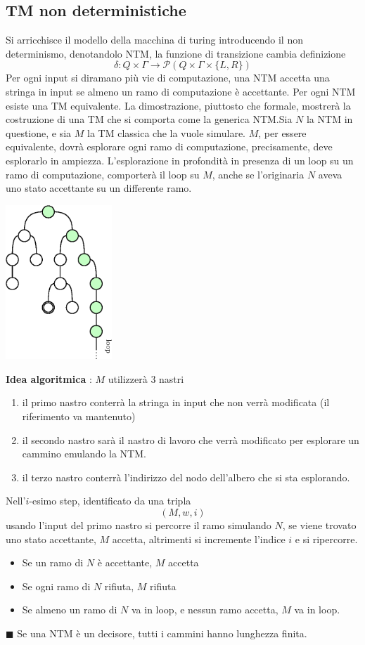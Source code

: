 \documentclass[10pt, letterpaper]{report}
\begin{document}
\subsection{TM non deterministiche}
Si arricchisce il modello della macchina di turing introducendo il non determinismo, denotandolo NTM, la funzione di transizione cambia definizione 
$$ \delta : Q\times\Gamma \rightarrow \mathcal{P}(Q\times \Gamma \times \{L,R\})$$
Per ogni input si diramano più vie di computazione, una NTM accetta una stringa in input se almeno un ramo di computazione è accettante.\acc 
{} Per ogni NTM esiste una TM equivalente.\acc 
\dimo{} La dimostrazione, piuttosto che formale, mostrerà la costruzione di una 
TM che si comporta come la generica NTM.\acc Sia $N$ la NTM in questione, e sia $M$ la TM classica che la vuole 
simulare. $M$, per essere equivalente, dovrà esplorare ogni ramo di computazione, precisamente, deve esplorarlo in ampiezza. L'esplorazione in profondità in presenza di un loop su un ramo di computazione, comporterà il loop su $M$, anche se l'originaria $N$ aveva uno stato accettante su un differente ramo. \begin{center}
    \includegraphics[width=0.3\textwidth ]{images/loopEAccettante.eps} 
\end{center}
\textbf{Idea algoritmica} : $M$ utilizzerà 3 nastri\begin{enumerate}
    \item il primo nastro conterrà la stringa in input che non verrà modificata (il riferimento va mantenuto)
    \item il secondo nastro sarà il nastro di lavoro che verrà modificato per esplorare un cammino emulando la NTM.
    \item il terzo nastro conterrà l'indirizzo del nodo 
    dell'albero che si sta esplorando.
\end{enumerate}
Nell'$i$-esimo step, identificato da una tripla 
$$ (M,w,i)$$
usando l'input del primo nastro si percorre il ramo simulando $N$, se viene trovato uno stato accettante, 
$M$ accetta, altrimenti si incremente l'indice $i$
 e si ripercorre.
 \begin{itemize}
    \item Se un ramo di $N$ è accettante, $M$ accetta 
    \item Se ogni ramo di $N$ rifiuta, $M$ rifiuta 
    \item Se almeno un ramo di $N$ va in loop, e nessun 
    ramo accetta, $M$ va in loop.
 \end{itemize}
 \hfill$\blacksquare$\acc
Se una NTM è un decisore, tutti i cammini hanno lunghezza finita.
\end{document}
